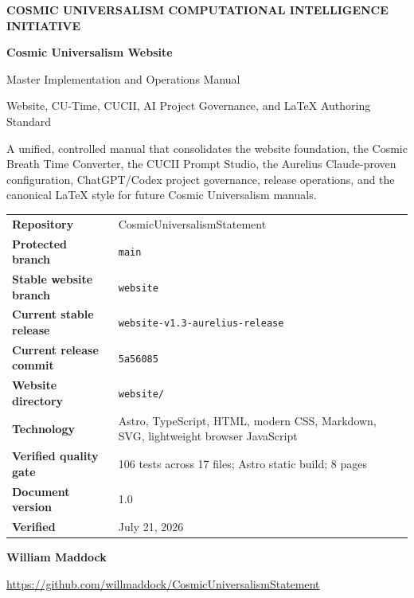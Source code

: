 \documentclass[11pt,letterpaper]{article}
\newcommand{\ProjectTitle}{Cosmic Universalism Website}
\newcommand{\DocumentTitle}{Master Implementation and Operations Manual}
\newcommand{\DocumentSubtitle}{Website, CU-Time, CUCII, AI Project Governance, and LaTeX Authoring Standard}
\newcommand{\RepositoryName}{CosmicUniversalismStatement}
\newcommand{\RepositoryURL}{https://github.com/willmaddock/CosmicUniversalismStatement}
\newcommand{\ProtectedBranch}{main}
\newcommand{\StableBranch}{website}
\newcommand{\WebsiteDirectory}{website/}
\newcommand{\CurrentReleaseTag}{website-v1.3-aurelius-release}
\newcommand{\CurrentReleaseCommit}{5a56085}
\newcommand{\DocumentVersion}{1.0}
\newcommand{\VerificationDate}{July 21, 2026}
\newcommand{\AuthorName}{William Maddock}
\begin{document}
\hypersetup{pageanchor=false}

\begin{titlepage}
\pagecolor{CUNavy}
\color{white}
\thispagestyle{empty}

\vspace*{0.55in}

{\small\bfseries\color{CUCyanLight}
COSMIC UNIVERSALISM COMPUTATIONAL INTELLIGENCE INITIATIVE}

\vspace{0.38in}

{\Huge\bfseries
\ProjectTitle}

\vspace{0.16in}

{\LARGE\color{CUGoldLight}
\DocumentTitle}

\vspace{0.12in}

{\large\color{CUBlueLight}
\DocumentSubtitle}

\vspace{0.34in}

{\large
A unified, controlled manual that consolidates the website foundation, the
Cosmic Breath Time Converter, the CUCII Prompt Studio, the Aurelius
Claude-proven configuration, ChatGPT/Codex project governance, release
operations, and the canonical LaTeX style for future Cosmic Universalism
manuals.}

\vfill

\begin{tcolorbox}[
    colback=CUNavyTwo, colframe=CUBlue, boxrule=0.8pt, arc=2mm,
    width=\textwidth
]
\color{white}
\begin{tabularx}{\textwidth}{>{\bfseries}L{1.75in}Y}
Repository & \RepositoryName \\
Protected branch & \texttt{\ProtectedBranch} \\
Stable website branch & \texttt{\StableBranch} \\
Current stable release & \texttt{\CurrentReleaseTag} \\
Current release commit & \texttt{\CurrentReleaseCommit} \\
Website directory & \texttt{\WebsiteDirectory} \\
Technology & Astro, TypeScript, HTML, modern CSS, Markdown, SVG, lightweight browser JavaScript \\
Verified quality gate & 106 tests across 17 files; Astro static build; 8 pages \\
Document version & \DocumentVersion \\
Verified & \VerificationDate \\
\end{tabularx}
\end{tcolorbox}

\vspace{0.32in}

{\large\bfseries \AuthorName}

\vspace{0.08in}

{\small\url{\RepositoryURL}}

\end{titlepage}
\end{document}
